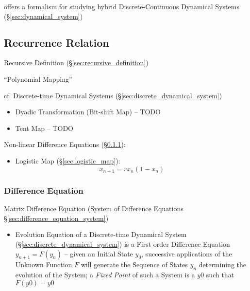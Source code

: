 offers a formalism for studying hybrid Discrete-Continuous Dynamical Systems
(\S\ref{sec:dynamical_system})



\subsection{Recurrence Relation}\label{sec:recurrence_relation}

Recursive Definition (\S\ref{sec:recursive_definition})

``Polynomial Mapping''

\fist cf. Discrete-time Dynamical Systems
(\S\ref{sec:discrete_dynamical_system})

\begin{itemize}
  \item Dyadic Transformation (Bit-shift Map) -- TODO
  \item Tent Map -- TODO
\end{itemize}

Non-linear Difference Equations (\S\ref{sec:difference_equation}):
\begin{itemize}
  \item Logistic Map (\S\ref{sec:logistic_map}):\[
    x_{n+1} = rx_n(1-x_n)
  \]
\end{itemize}



\subsubsection{Difference Equation}\label{sec:difference_equation}

\fist Matrix Difference Equation (System of Difference Equations
\S\ref{sec:difference_equation_system})

\begin{itemize}
  \item Evolution Equation of a Discrete-time Dynamical System
    (\S\ref{sec:discrete_dynamical_system}) is a First-order Difference Equation
    $y_{n+1} = F(y_n)$ -- given an Initial State $y_0$, successive applications
    of the Unknown Function $F$ will generate the Sequence of States $y_n$
    determining the evolution of the System; a \emph{Fixed Point} of such a
    System is a $y0$ such that $F(y0) = y0$
\end{itemize}

